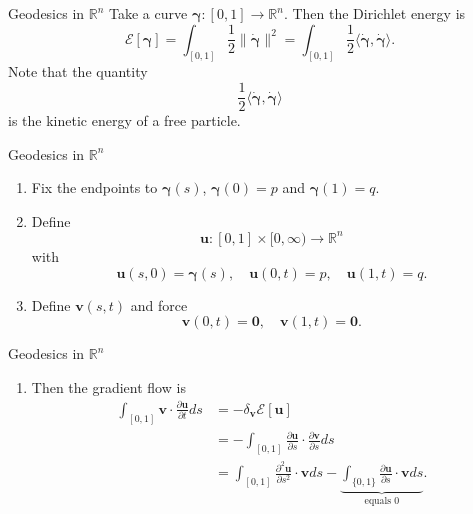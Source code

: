 \documentclass[usenames,dvipsnames]{beamer}
\theoremstyle{definition}
\theoremstyle{theorem}
\newcommand{\R}{\mathbb{R}}
\newcommand{\position}{\boldsymbol{\gamma}}
\newcommand{\velocity}{\boldsymbol{\dot{\gamma}}}
\begin{document}
    \begin{frame}{Geodesics in $\R^n$}
        Take a curve $\boldsymbol{\gamma}\colon [0,1]\to \R^n$.  Then the Dirichlet energy is
        \[
        \mathcal{E}[\boldsymbol{\gamma}] = \int_{[0,1]} \frac{1}{2}\|\boldsymbol{\dot{\gamma}}\|^2 = \int_{[0,1]}\frac{1}{2} \langle \velocity, \velocity \rangle.
        \]
        Note that the quantity
        \[
        \frac{1}{2}\langle \velocity,\velocity \rangle
        \]
        is the kinetic energy of a free particle.
    \end{frame}
    
    \begin{frame}{Geodesics in $\R^n$}
        \begin{enumerate}[1.]
            \item Fix the endpoints to $\position(s)$, $\position(0)=p$ and $\position(1)=q$. 
            \item Define 
            \[
            \mathbf{u} \colon [0,1]\times [0,\infty) \to \R^n
            \]
            with
            \[
            \mathbf{u}(s,0)=\position(s),\quad \mathbf{u}(0,t)=p,\quad \mathbf{u}(1,t)=q.
            \]
            \item Define $\mathbf{v}(s,t)$ and force
            \[
            \mathbf{v}(0,t)=\mathbf{0},\quad \mathbf{v}(1,t)=\mathbf{0}.
            \]
        \end{enumerate}
    \end{frame}
    
    \begin{frame}{Geodesics in $\R^n$}
        \begin{enumerate}[4.]
            \item Then the gradient flow is
            \begin{align*}
            \int_{[0,1]} \mathbf{v}\cdot  \frac{\partial \mathbf{u}}{\partial t} ds&= - \delta_\mathbf{v} \mathcal{E}[\mathbf{u}]\\
            &= -\int_{[0,1]} \frac{\partial \mathbf{u}}{\partial s}\cdot \frac{\partial \mathbf{v}}{\partial s}ds\\
            &= \int_{[0,1]} \frac{\partial^2 \mathbf{u}}{\partial s^2}\cdot \mathbf{v} ds - \underbrace{\int_{\{0,1\}} \frac{\partial \mathbf{u}}{\partial s}\cdot \mathbf{v}ds}_{\textrm{equals 0}}.
            \end{align*}
        \end{enumerate}
    \end{frame}
    
\end{document}
